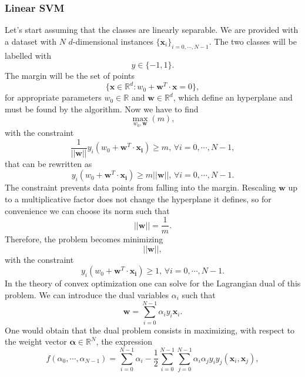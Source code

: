 \documentclass[12pt]{article}
\begin{document}
\subsubsection{Linear SVM}
Let's start assuming that the classes are linearly separable. We are provided with a dataset with $N$ $d$-dimensional instances $\{\mathbf{x}_i\}_{i=0,\cdots, N-1}$. The two classes will be labelled with $$y\in \{-1,1\}.$$ The margin will be the set of points 
\begin{equation}
    \{\mathbf{x}\in\mathbb{R}^d: w_0+\mathbf{w}^T\cdot \mathbf{x}=0\},
    \label{margin definition}
\end{equation}  
for appropriate parameters $w_0\in \mathbb{R}$ and $\mathbf{w}\in \mathbb{R}^d$, which define an hyperplane and must be found by the algorithm. Now we have to find $$\max_{w_0, \mathbf{w}}(m),$$ with the constraint 
\begin{equation}
    \frac{1}{||\mathbf{w}||}y_i(w_0+\mathbf{w}^T\cdot \mathbf{x_i})\geq m, \, \forall i=0,\cdots, N-1,
\end{equation}
that can be rewritten as 
\begin{equation}
    y_i(w_0+\mathbf{w}^T\cdot \mathbf{x_i})\geq m||\mathbf{w}||, \, \forall i=0,\cdots, N-1.
\end{equation}
The constraint prevents data points from falling into the margin. Rescaling $\mathbf{w}$ up to a multiplicative factor does not change the hyperplane it defines, so for convenience we can choose its norm such that 
\begin{equation}
    ||\mathbf{w}||=\frac{1}{m}.
\end{equation}
Therefore, the problem becomes minimizing
$$||\mathbf{w}||, $$ with the constraint 
\begin{equation}
    y_i(w_0+\mathbf{w}^T\cdot \mathbf{x_i})\geq 1, \, \forall i=0,\cdots, N-1.
    \label{constraint hard margin}
\end{equation}
In the theory of convex optimization one can solve for the Lagrangian dual of this problem. We can introduce the dual variables $\alpha_i$ such that
\begin{equation}
    \mathbf{w}=\sum_{i=0}^{N-1}\alpha_iy_i\mathbf{x}_i.
    \label{alpha def}
\end{equation} 
One would obtain that the dual problem consists in maximizing, with respect to the weight vector $\mathbf{\alpha}\in\mathbb{R}^N$, the expression 
\begin{equation}
    f(\alpha_0,\cdots,\alpha_{N-1})=\sum_{i=0}^{N-1} \alpha_i-\frac{1}{2}\sum_{i=0}^{N-1}\sum_{j=0}^{N-1}\alpha_i\alpha_jy_iy_j(\mathbf{x}_i,\mathbf{x}_j),
    \label{dual problem SVM}
\end{equation}
\end{document}
